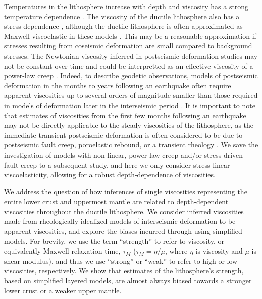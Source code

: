 Temperatures in the lithosphere increase with depth and viscosity has
a strong temperature dependence \citep[e.g.,][]{Kohlstedt1995}.  The
viscosity of the ductile lithosphere also has a stress-dependence
\citep[e.g.,][]{Kohlstedt1995}, although the ductile lithosphere is
often approximated as Maxwell viscoelastic in these models
\citep[e.g.,][]{Hetland2003, Johnson2007, Riva2009, Yamasaki2012a}.
This may be a reasonable approximation if stresses resulting from
coseismic deformation are small compared to background stresses.  The
Newtonian viscosity inferred in postseismic deformation studies may
not be constant over time and could be interpretted as an effective
viscosity of a power-law creep \citep[e.g.,][]{Freed2006b}. Indeed, to
describe geodetic observations, models of postseismic deformation in
the months to years following an earthquake often require apparent
viscosities up to several orders of magnitude smaller than those
required in models of deformation later in the interseismic period
\citep[e.g.,][]{Pollitz2005,Johnson2007,Meade2013}. It is important to
note that estimates of viscosities from the first few months following
an earthquake may not be directly applicable to the steady viscosities
of the lithosphere, as the immediate transient postseismic deformation
is often considered to be due to postseismic fault creep, poroelastic
rebound, or a transient rheology \citep[e.g.,][]{Pollitz2003,
Freed2006b, Hearn2009}. We save the investigation of models with
non-linear, power-law creep and/or stress driven fault creep to a
subsequent study, and here we only consider stress-linear
viscoelasticity, allowing for a robust depth-dependence of
viscosities.

We address the question of how inferences of single viscosities
representing the entire lower crust and uppermost mantle are related
to depth-dependent viscosities throughout the ductile lithosphere. We
consider inferred viscosities made from rheologically idealized models
of interseismic deformation to be apparent viscosities, and explore
the biases incurred through using simplified models. For brevity, we
use the term ``strength'' to refer to viscosity, or equivalently
Maxwell relaxation time, $\tau_M$ ($\tau_M = \eta/\mu$, where $\eta$
is viscosity and $\mu$ is shear modulus), and thus we use ``strong''
or ``weak'' to refer to high or low viscosities, respectively. We show
that estimates of the lithosphere's strength, based on simplified
layered models, are almost always biased towards a stronger lower
crust or a weaker upper mantle.

